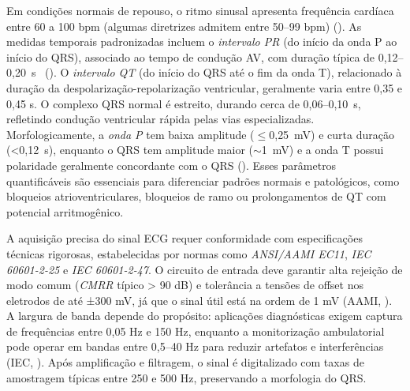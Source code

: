 
Em condições normais de repouso, o ritmo sinusal apresenta frequência cardíaca entre 60 a 100 bpm (algumas diretrizes admitem entre 50–99 bpm) (). As medidas temporais padronizadas incluem o \textit{intervalo PR} (do início da onda P ao início do QRS), associado ao tempo de condução AV, com duração típica de 0{,}12--0{,}20~s~ (). O \textit{intervalo QT} (do início do QRS até o fim da onda T), relacionado à duração da despolarização-repolarização ventricular, geralmente varia entre 0,35 e 0,45 s. O complexo QRS normal é estreito, durando cerca de 0{,}06--0{,}10~s, refletindo condução ventricular rápida pelas vias especializadas. Morfologicamente, a \textit{onda P} tem baixa amplitude ($\leq$0{,}25~mV) e curta duração (<0{,}12~s), enquanto o QRS tem amplitude maior ($\sim$1~mV) e a onda T possui polaridade geralmente concordante com o QRS (). Esses parâmetros quantificáveis são essenciais para diferenciar padrões normais e patológicos, como bloqueios atrioventriculares, bloqueios de ramo ou prolongamentos de QT com potencial arritmogênico.

A aquisição precisa do sinal \acs{ECG} requer conformidade com especificações técnicas rigorosas, estabelecidas por normas como \textit{ANSI/AAMI EC11}, \textit{IEC 60601-2-25} e \textit{IEC 60601-2-47}. O circuito de entrada deve garantir alta rejeição de modo comum (\textit{CMRR} típico > 90 dB) e tolerância a tensões de offset nos eletrodos de até ±300 mV, já que o sinal útil está na ordem de 1 mV (AAMI, \citeyear{aamiEC11}). A largura de banda depende do propósito: aplicações diagnósticas exigem captura de frequências entre 0{,}05 Hz e 150 Hz, enquanto a monitorização ambulatorial pode operar em bandas entre 0{,}5–40 Hz para reduzir artefatos e interferências (IEC, \citeyear{iec60601}). Após amplificação e filtragem, o sinal é digitalizado com taxas de amostragem típicas entre 250 e 500 Hz, preservando a morfologia do QRS.


